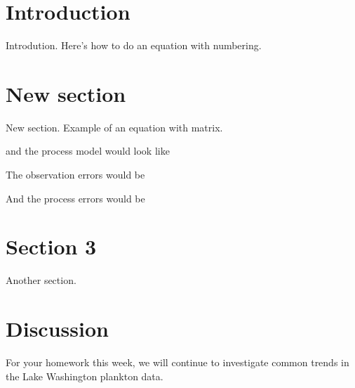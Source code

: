 \documentclass[
  12pt,
]{book}
\begin{document}
\hypertarget{introduction}{%
\section{Introduction}\label{introduction}}

Introdution. Here's how to do an equation with numbering.

\hypertarget{new-section}{%
\section{New section}\label{new-section}}

New section. Example of an equation with matrix.

and the process model would look like

The observation errors would be

And the process errors would be

\hypertarget{section-3}{%
\section{Section 3}\label{section-3}}

Another section.

\hypertarget{discussion}{%
\section{Discussion}\label{discussion}}

For your homework this week, we will continue to investigate common
trends in the Lake Washington plankton data.
\end{document}
